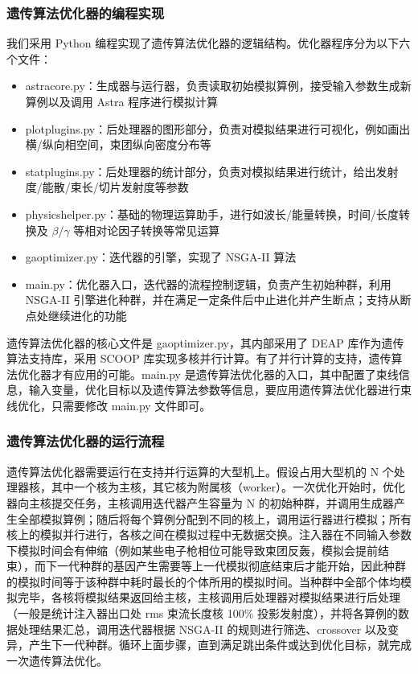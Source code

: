 \subsubsection{遗传算法优化器的编程实现}
我们采用 Python 编程实现了遗传算法优化器的逻辑结构。优化器程序分为以下六个文件：
\begin{itemize}
\item {\sf astracore.py}：生成器与运行器，负责读取初始模拟算例，接受输入参数生成新算例以及调用 Astra 程序进行模拟计算
\item {\sf plotplugins.py}：后处理器的图形部分，负责对模拟结果进行可视化，例如画出横/纵向相空间，束团纵向密度分布等
\item {\sf statplugins.py}：后处理器的统计部分，负责对模拟结果进行统计，给出发射度/能散/束长/切片发射度等参数
\item {\sf physicshelper.py}：基础的物理运算助手，进行如波长/能量转换，时间/长度转换及 $\beta$/$\gamma$ 等相对论因子转换等常见运算
\item {\sf gaoptimizer.py}：迭代器的引擎，实现了 NSGA-II 算法
\item {\sf main.py}：优化器入口，迭代器的流程控制逻辑，负责产生初始种群，利用 NSGA-II 引擎进化种群，并在满足一定条件后中止进化并产生断点；支持从断点处继续进化的功能
\end{itemize}
遗传算法优化器的核心文件是 {\sf gaoptimizer.py}，其内部采用了 DEAP 库作为遗传算法支持库，采用 SCOOP 库实现多核并行计算。有了并行计算的支持，遗传算法优化器才有应用的可能。{\sf main.py} 是遗传算法优化器的入口，其中配置了束线信息，输入变量，优化目标以及遗传算法参数等信息，要应用遗传算法优化器进行束线优化，只需要修改 {\sf main.py} 文件即可。

\subsubsection{遗传算法优化器的运行流程}
遗传算法优化器需要运行在支持并行运算的大型机上。假设占用大型机的 N 个处理器核，其中一个核为主核，其它核为附属核（worker）。一次优化开始时，优化器向主核提交任务，主核调用迭代器产生容量为 N 的初始种群，并调用生成器产生全部模拟算例；随后将每个算例分配到不同的核上，调用运行器进行模拟；所有核上的模拟并行进行，各核之间在模拟过程中无数据交换。注入器在不同输入参数下模拟时间会有伸缩（例如某些电子枪相位可能导致束团反轰，模拟会提前结束），而下一代种群的基因产生需要等上一代模拟彻底结束后才能开始，因此种群的模拟时间等于该种群中耗时最长的个体所用的模拟时间。当种群中全部个体均模拟完毕，各核将模拟结果返回给主核，主核调用后处理器对模拟结果进行后处理（一般是统计注入器出口处 rms 束流长度核 100\% 投影发射度），并将各算例的数据处理结果汇总，调用迭代器根据 NSGA-II 的规则进行筛选、crossover 以及变异，产生下一代种群。循环上面步骤，直到满足跳出条件或达到优化目标，就完成一次遗传算法优化。

